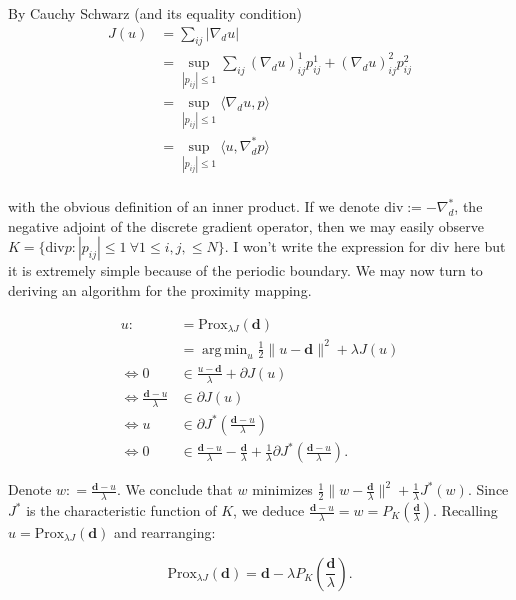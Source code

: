 \documentclass[paper=a4, fontsize=11pt]{scrartcl} %
\DeclareMathOperator*{\argmin}{arg\,min}
\numberwithin{equation}{section} %
\numberwithin{figure}{section} %
\numberwithin{table}{section} %
\newcommand{\data}{\mathbf{d}}
\newcommand{\prox}{\text{Prox}}
\newcommand{\grad}{\nabla_{d} }
\newcommand{\divg}{\text{div}}
\begin{document}
By Cauchy Schwarz (and its equality condition)   
\begin{align*}
  J(u) &= \sum_{ij} | \grad u | \\ 
  &= \sup_{|p_{ij}| \leq 1} \sum_{ij} (\grad u)^1_{ij} p^{1}_{ij} + (\grad u)^2_{ij} p^{2}_{ij} \\
  &= \sup_{|p_{ij}| \leq 1} \langle \grad u, p  \rangle \\
  &= \sup_{|p_{ij}| \leq 1} \langle u, \grad^{*} p  \rangle \\
\end{align*}

with the obvious definition of an inner product. If we denote $ \divg
:= -\grad^{*}$, the negative adjoint of the discrete gradient
operator, then we may easily observe $K = \{ \divg p: |p_{ij}| \leq 1
\ \forall 1 \leq i,j, \leq N \}$. I won't write the expression for
$\divg$ here but it is extremely simple because of the periodic
boundary. We may now turn to deriving an algorithm for the proximity
mapping.

\begin{align*}
  u :&= \prox_{\lambda J}(\data) \\
  &= \argmin_{u} \frac{1}{2}\| u - \data \|^2 + \lambda J(u) \\
  \Leftrightarrow 0 &\in \frac{u - \data}{\lambda} + \partial J(u) \\
  \Leftrightarrow \frac{\data - u}{\lambda} &\in \partial J(u) \\
  \Leftrightarrow u &\in \partial J^{*}\left ( \frac{\data - u}{\lambda}\right ) \\
  \Leftrightarrow 0
  &\in \frac{\data - u}{\lambda} - \frac{\data}{\lambda} + \frac{1}{\lambda} \partial J^{*}\left ( \frac{\data - u}{\lambda} \right ).
\end{align*}

Denote $w: = \frac{\data - u}{\lambda}$. We conclude that $w$
minimizes $\frac{1}{2}\| w - \frac{\data}{\lambda}\|^2 +
\frac{1}{\lambda}J^{*}(w)$.  Since $J^{*}$ is the characteristic
function of $K$, we deduce $\frac{\data-u}{\lambda} = w = P_{K}( \frac{\data}{\lambda} )$.
Recalling $u= \prox_{\lambda J}(\data)$ and rearranging:

\begin{equation*}%
  \prox_{\lambda J}(\data) = \data -  \lambda P_{K}\left ( \frac{\data}{\lambda} \right ).
\end{equation*}
\end{document}
